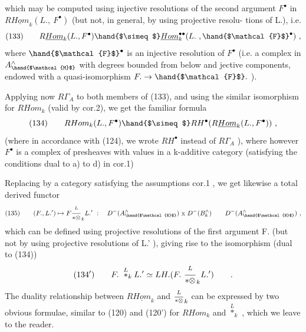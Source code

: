 
which may be computed using injective resolutions of the second argument
$F^\bullet$ in $R\underline{Hom}_k(L.,\ F^\bullet)$ (but not, in general, by using projective resolu-%
tions of L.), i.e.
\[ (133) \qquad R\underline{Hom}_k(L.,F^\bullet) \hand{$\simeq$} \underline{Hom}_k^{\bullet\bullet}(L.\ ,\hand{$\mathcal{F}$}^\bullet) \ , \]
where $\hand{$\mathcal{F}$}^\bullet$ is an injective resolution of $F^\bullet$ (i.e. a complex in $A^\wedge_{\hand{$\mathcal{M}$}}$ with
degrees bounded from below and jective components, endowed with a
quasi-isomorphism $F.\to\hand{$\mathcal{F}$}.$ ).

Applying now $R\Gamma_A$ to both members of (133), and using the similar
isomorphism for $RHom_k$ (valid by cor.2), we get the familiar formula
\[ (134) \qquad RHom_k(L.,F^\bullet) \hand{$\simeq$} RH^\bullet(R\underline{Hom}_k(L.,F^\bullet)) \ , \]
(where in accordance with (124), we wrote $RH^\bullet$ instead of $R\Gamma_A$ ), where
however $F^\bullet$ is  a complex of  presheaves with values in a
k-additive category  (satisfying the conditions dual to a) to d) in
cor.1)

\margin{\unsure{$\vdash$}}Replacing  by a category  satisfying the assumptions   cor.1 ,
we get likewise a total  derived functor
\[ (135) \qquad (F.,L.')\mapsto F \overset{L}{\over{\ast}{\otimes}}_k L.' \ : \quad D^-(A^\wedge_{\hand{$\mathcal{N}$}}) \text{ x } D^-(B^\wedge_k) \qquad D^-(A^\wedge_{\hand{$\mathcal{N}$}}) \ , \]
which can be defined  using projective resolutions of the first argument
F. (but not by using projective resolutions of L.' ), giving rise to
the isomorphism (dual to (134))
\[ (134') \qquad F.\ \overset{L}{\ast}_k L.' \simeq LH.(F.\ \overset{L}{\over{\ast}{\otimes}}_k L.') \qquad . \]
The duality relationship between $R\underline{Hom}_k$ and $\overset{L}{\over{\ast}{\otimes}}_k$ can be expressed by
two obvious formulae, similar to (120) and (120') for $RHom_k$ and $\overset{L}{\ast}_k$ ,
which we leave to the reader.

